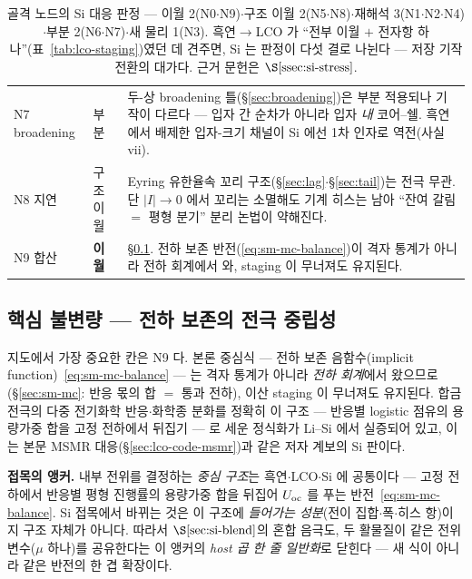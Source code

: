 \begin{table}[h]
\begin{tabular}{p{} p{} p{}}
N7 broadening & 부분 & 두-상 broadening 틀(\S\ref{sec:broadening})은 부분 적용되나 기작이 다르다 --- 입자 간 순차가 아니라 입자 \emph{내} 코어--쉘. 흑연에서 배제한 입자-크기 채널이 Si 에선 1차 인자로 역전(사실 vii). \\
N8 지연 & 구조 이월 & Eyring 유한율속 꼬리 구조(\S\ref{sec:lag}$\cdot$\S\ref{sec:tail})는 전극 무관. 단 $|I|\!\to\!0$ 에서 꼬리는 소멸해도 기계 히스는 남아 ``잔여 갈림 $=$ 평형 분기'' 분리 논법이 약해진다. \\
N9 합산 & \textbf{이월} & \S\ref{ssec:si-carry}. 전하 보존 반전(\eqref{eq:sm-mc-balance})이 격자 통계가 아니라 전하 회계에서 와, staging 이 무너져도 유지된다. \\
\bottomrule
\end{tabular}
\caption{골격 노드의 Si 대응 판정 --- 이월 2(N0$\cdot$N9)$\cdot$구조 이월 2(N5$\cdot$N8)$\cdot$재해석
3(N1$\cdot$N2$\cdot$N4)$\cdot$부분 2(N6$\cdot$N7)$\cdot$새 물리 1(N3). 흑연$\to$LCO 가 ``전부 이월 $+$
전자항 하나''(표~\ref{tab:lco-staging})였던 데 견주면, Si 는 판정이 다섯 결로 나뉜다 --- 저장 기작
전환의 대가다. 근거 문헌은 $\S\ref{ssec:si-stress}$.}
\label{tab:si-survival}
\end{table}

\subsection{핵심 불변량 --- 전하 보존의 전극 중립성}\label{ssec:si-carry}
지도에서 가장 중요한 칸은 N9 다. 본론 중심식 --- 전하 보존 음함수(implicit function)~\eqref{eq:sm-mc-balance} --- 는 격자
통계가 아니라 \emph{전하 회계}에서 왔으므로(\S\ref{sec:sm-mc}: 반응 몫의 합 $=$ 통과 전하), 이산 staging
이 무너져도 유지된다. 합금 전극의 다중 전기화학 반응$\cdot$화학종 분화를 정확히 이 구조 --- 반응별
logistic 점유의 용량가중 합을 고정 전하에서 뒤집기 --- 로 세운 정식화가 Li--Si 에서 실증되어
있고\cite{verbrugge_lisi2016}, 이는 본문 MSMR 대응(\S\ref{sec:lco-code-msmr})과 같은 저자 계보의 Si 판이다.

\begin{keybox}
\textbf{접목의 앵커.} 내부 전위를 결정하는 \emph{중심 구조}는 흑연$\cdot$LCO$\cdot$Si 에 공통이다 ---
고정 전하에서 반응별 평형 진행률의 용량가중 합을 뒤집어 $U_{\mathrm{oc}}$ 를 푸는
반전~\eqref{eq:sm-mc-balance}. Si 접목에서 바뀌는 것은 이 구조에 \emph{들어가는 성분}(전이
집합$\cdot$폭$\cdot$히스 항)이지 구조 자체가 아니다. 따라서 $\S\ref{sec:si-blend}$의 혼합 음극도, 두
활물질이 같은 전위 변수($\mu$ 하나)를 공유한다는 이 앵커의 \emph{host 곱 한 줄 일반화}로 닫힌다 ---
새 식이 아니라 같은 반전의 한 겹 확장이다.
\end{keybox}

